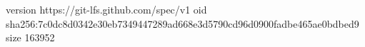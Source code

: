 version https://git-lfs.github.com/spec/v1
oid sha256:7c0dc8d0342e30eb7349447289ad668e3d5790cd96d0900fadbe465ae0bdbed9
size 163952
